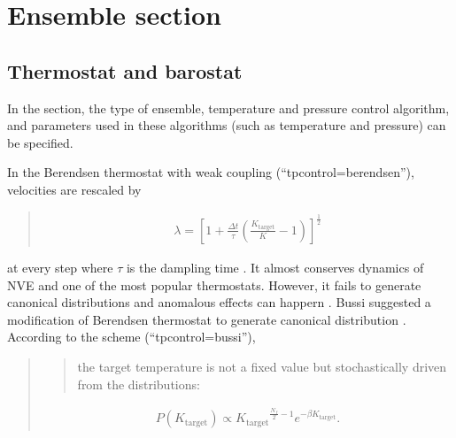 \documentclass[a4paper,11pt,oneside,english]{sphinxmanual}
\begin{document}
\chapter{Ensemble section}
\label{\detokenize{09_Ensemble:ensemble-section}}\label{\detokenize{09_Ensemble:ensemble}}\label{\detokenize{09_Ensemble::doc}}

\section{Thermostat and barostat}
\label{\detokenize{09_Ensemble:thermostat-and-barostat}}
In the \sphinxstylestrong{{[}ENSEMBLE{]}} section, the type of ensemble, temperature and
pressure control algorithm, and parameters used in these algorithms
(such as temperature and pressure) can be specified.

In the Berendsen thermostat with weak coupling (“tpcontrol=berendsen”), velocities are rescaled by
\begin{quote}

\vspace{-5mm}
\begin{equation*}
\begin{split}\lambda = \left [ 1 + \frac{\Delta t}{\tau} \left ( \frac{K_{\textrm{target}}}{K} - 1 \right) \right]^{\frac{1}{2}}\end{split}
\end{equation*}
\vspace{-3mm}
\end{quote}

at every step where \({\tau}\) is the dampling time . It almost conserves dynamics
of NVE and one of the most popular thermostats. However, it fails to generate canonical distributions and
anomalous effects can happern . Bussi suggested a modification of Berendsen thermostat to
generate canonical distribution . According to the scheme (“tpcontrol=bussi”),
\begin{quote}
\begin{quote}

the target temperature is not a fixed value but stochastically driven from the distributions:
\end{quote}

\vspace{-5mm}
\begin{equation*}
\begin{split}P \left( {K_{\textrm{target}}} \right ) \propto {K_{\textrm{target}}}^{\frac{N_{f}}{2}-1} e ^ {-\beta K_{\textrm{target}}} .\end{split}
\end{equation*}
\vspace{-3mm}
\end{quote}
\end{document}
